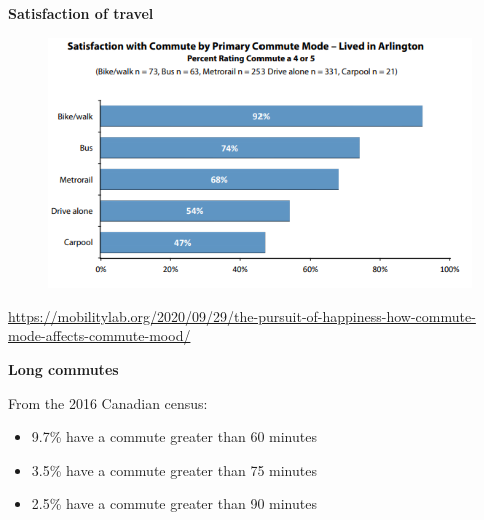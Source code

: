 \documentclass[aspectratio=169]{beamer}
\begin{document}
\begin{frame}
	
	\textbf{Satisfaction of travel}
	
	\begin{figure}
		\centering
		\includegraphics[width=0.7\linewidth]{images/mode_satisfaction.png}
	\end{figure}
	
	\tiny\url{https://mobilitylab.org/2020/09/29/the-pursuit-of-happiness-how-commute-mode-affects-commute-mood/}
	
\end{frame}



\begin{frame}
	
	\textbf{Long commutes}
	
	\vspace{4mm}
	
	From the 2016 Canadian census:
	
	\begin{itemize}
		\item 9.7\% have a commute greater than 60 minutes
		
		\item 3.5\% have a commute greater than 75 minutes
		
		\item 2.5\% have a commute greater than 90 minutes
	\end{itemize}
	
\end{frame}



\end{document}
